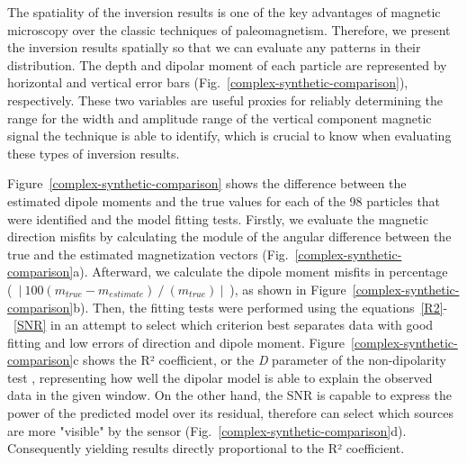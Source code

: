 The spatiality of the inversion results is one of the key advantages of magnetic microscopy over the classic techniques of paleomagnetism. Therefore, we present the inversion results spatially so that we can evaluate any patterns in their distribution. The depth and dipolar moment of each particle are represented by horizontal and vertical error bars (Fig.~\ref{complex-synthetic-comparison}), respectively. These two variables are useful proxies for reliably determining the range for the width and amplitude range of the vertical component magnetic signal the technique is able to identify, which is crucial to know when evaluating these types of inversion results.

Figure~\ref{complex-synthetic-comparison} shows the difference between the estimated dipole moments and the true values for each of the 98 particles that were identified and the model fitting tests. Firstly, we evaluate the magnetic direction misfits by calculating the module of the angular difference between the true and the estimated magnetization vectors (Fig.~\ref{complex-synthetic-comparison}a). Afterward, we calculate the dipole moment misfits in percentage (~$|~100 \left( m_{true} - m_{estimate}\right)~/~\left(m_{true}\right)~|$~), as shown in Figure~\ref{complex-synthetic-comparison}b). Then, the fitting tests were performed using the equations~\ref{R2}-~\ref{SNR} in an attempt to select which criterion best separates data with good fitting and low errors of direction and dipole moment. Figure~\ref{complex-synthetic-comparison}c shows the R² coefficient, or the \emph{D} parameter of the non-dipolarity test \citep{Fu2020}, representing how well the dipolar model is able to explain the observed data in the given window. On the other hand, the SNR is capable to express the power of the predicted model over its residual, therefore can select which sources are more "visible" by the sensor (Fig.~\ref{complex-synthetic-comparison}d). Consequently yielding results directly proportional to the R² coefficient. 


